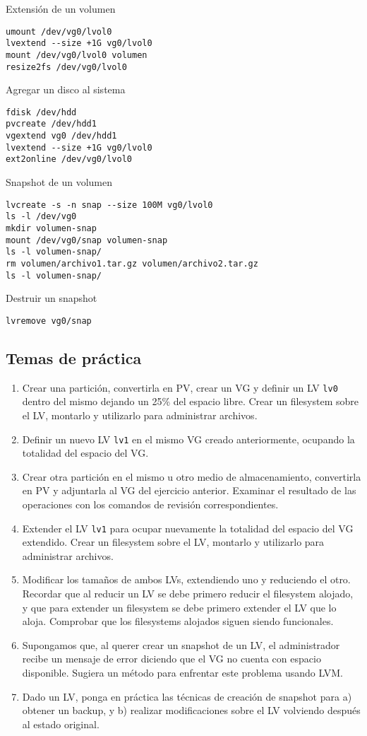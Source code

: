 Extensión de un volumen
\begin{lstlisting}
umount /dev/vg0/lvol0
lvextend --size +1G vg0/lvol0
mount /dev/vg0/lvol0 volumen
resize2fs /dev/vg0/lvol0 
\end{lstlisting}

Agregar un disco al sistema
\begin{lstlisting}
fdisk /dev/hdd
pvcreate /dev/hdd1
vgextend vg0 /dev/hdd1
lvextend --size +1G vg0/lvol0 
ext2online /dev/vg0/lvol0 
\end{lstlisting}

Snapshot de un volumen
\begin{lstlisting}
lvcreate -s -n snap --size 100M vg0/lvol0
ls -l /dev/vg0
mkdir volumen-snap
mount /dev/vg0/snap volumen-snap
ls -l volumen-snap/
rm volumen/archivo1.tar.gz volumen/archivo2.tar.gz
ls -l volumen-snap/
\end{lstlisting}

Destruir un snapshot
\begin{lstlisting}
lvremove vg0/snap
\end{lstlisting}

\subsection{Temas de práctica}
\begin{enumerate}
	\item Crear una partición, convertirla en PV, crear un VG y definir un LV \lstinline$lv0$ dentro del mismo dejando un 25\% del espacio libre. Crear un filesystem sobre el LV, montarlo y utilizarlo para administrar archivos.
	\item Definir un nuevo LV \lstinline$lv1$ en el mismo VG creado anteriormente, ocupando la totalidad del espacio del VG.
	\item Crear otra partición en el mismo u otro medio de almacenamiento, convertirla en PV y adjuntarla al VG del ejercicio anterior. Examinar el resultado de las operaciones con los comandos de revisión correspondientes. 
	\item Extender el LV \lstinline$lv1$ para ocupar nuevamente la totalidad del espacio del VG extendido. Crear un filesystem sobre el LV, montarlo y utilizarlo para administrar archivos.
	\item Modificar los tamaños de ambos LVs, extendiendo uno y reduciendo el otro. Recordar que al reducir un LV se debe primero reducir el filesystem alojado, y que para extender un filesystem se debe primero extender el LV que lo aloja. Comprobar que los filesystems alojados siguen siendo funcionales.
	\item Supongamos que, al querer crear un snapshot de un LV, el administrador recibe un mensaje de error diciendo que el VG no cuenta con espacio disponible. Sugiera un método para enfrentar este problema usando LVM.
	\item Dado un LV, ponga en práctica las técnicas de creación de snapshot para a) obtener un backup, y b) realizar modificaciones sobre el LV volviendo después al estado original.  
\end{enumerate}